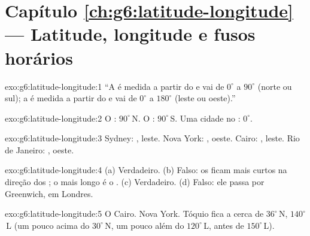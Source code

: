 \section*{Capítulo \ref{ch:g6:latitude-longitude} --- Latitude, longitude e fusos horários}

\begin{solution}{exo:g6:latitude-longitude:1}
``A  é medida a partir do  e vai de $0^\circ$ a $90^\circ$
(norte ou sul); a  é medida a partir do  e vai
de $0^\circ$ a $180^\circ$ (leste ou oeste).''
\end{solution}

\begin{solution}{exo:g6:latitude-longitude:2}
O : $90^\circ$\,N. O : $90^\circ$\,S. Uma cidade no
: $0^\circ$.
\end{solution}

\begin{solution}{exo:g6:latitude-longitude:3}
Sydney: , leste. Nova York: , oeste. Cairo:
, leste. Rio de Janeiro: , oeste.
\end{solution}

\begin{solution}{exo:g6:latitude-longitude:4}
(a) Verdadeiro. (b) Falso: os  ficam mais curtos na direção dos
; o mais longo é o . (c) Verdadeiro. (d) Falso: ele passa por
Greenwich, em Londres.
\end{solution}

\begin{solution}{exo:g6:latitude-longitude:5}
O Cairo. Nova York. Tóquio fica a cerca de $36^\circ$\,N, $140^\circ$\,L
(um pouco acima do  $30^\circ$\,N, um pouco além do 
$120^\circ$\,L, antes de $150^\circ$\,L).
\end{solution}

